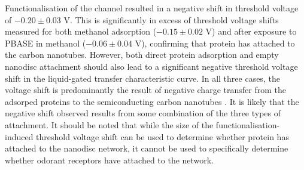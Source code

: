 \documentclass[
  a4paper,
]{scrbook}
\begin{document}
Functionalisation of the channel resulted in a negative shift in
threshold voltage of \(-0.20\pm0.03\) V. This is significantly in excess
of threshold voltage shifts measured for both methanol adsorption
(\(-0.15\pm0.02\) V) and after exposure to PBASE in methanol
(\(-0.06\pm0.04\) V), confirming that protein has attached to the carbon
nanotubes. However, both direct protein adsorption
\autocite{Bradley2004,Heller2008} and empty nanodisc attachment
\autocite{Murugathas2019b} should also lead to a significant negative
threshold voltage shift in the liquid-gated transfer characteristic
curve. In all three cases, the voltage shift is predominantly the result
of negative charge transfer from the adsorped proteins to the
semiconducting carbon nanotubes
\autocite{Bradley2004,Heller2008,Murugathas2019b}. It is likely that the
negative shift observed results from some combination of the three types
of attachment. It should be noted that while the size of the
functionalisation-induced threshold voltage shift can be used to
determine whether protein has attached to the nanodisc network, it
cannot be used to specifically determine whether odorant receptors have
attached to the network.
\end{document}
